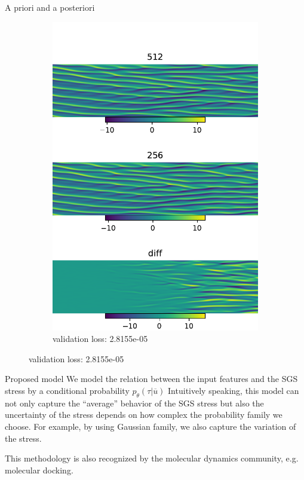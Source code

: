\documentclass[paper slide]{beamer}
\begin{document}
\begin{frame}{A priori and a posteriori}
\begin{figure}[ht]
\begin{subfigure}[b]{0.33\textwidth}
			\includegraphics[width=\textwidth]{fig/ks_nu0.1_N1512N2256_correct_cmp_lr5e-4.pdf} 
			\caption{validation loss: 2.8155e-05}  
		\end{subfigure}
	\end{figure}
\end{frame}


\begin{frame}{Proposed model}
	We model the relation between the input features and the SGS stress by
	a conditional probability $p_{\theta}(\tau | \overline{u})$
	Intuitively speaking, this model can not only capture the ``average''
	behavior of the SGS stress but also the {\color{red}uncertainty} of the
	stress depends on how complex the probability family we choose. For
	example, by using Gaussian family, we also capture the variation of the
	stress.

	This methodology is also recognized by the molecular dynamics community,
	e.g. molecular docking.
\end{frame}
\end{document}
